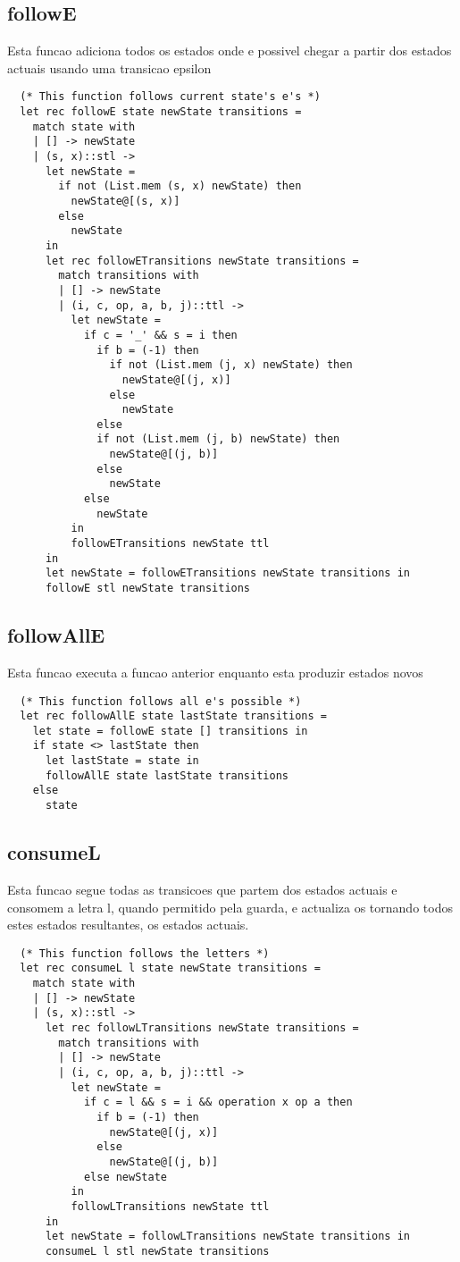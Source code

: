 \documentclass[11pt]{article}
\begin{document}
\subsection{followE}
\label{sec:orgf0d5f4e}
Esta funcao adiciona todos os estados onde e possivel chegar a partir dos estados actuais usando uma transicao epsilon
\begin{verbatim}
  (* This function follows current state's e's *)
  let rec followE state newState transitions =
    match state with
    | [] -> newState
    | (s, x)::stl ->
      let newState =
        if not (List.mem (s, x) newState) then
          newState@[(s, x)]
        else
          newState
      in
      let rec followETransitions newState transitions =
        match transitions with
        | [] -> newState
        | (i, c, op, a, b, j)::ttl ->
          let newState =
            if c = '_' && s = i then
              if b = (-1) then
                if not (List.mem (j, x) newState) then
                  newState@[(j, x)]
                else
                  newState
              else
              if not (List.mem (j, b) newState) then
                newState@[(j, b)]
              else
                newState
            else
              newState
          in
          followETransitions newState ttl
      in
      let newState = followETransitions newState transitions in
      followE stl newState transitions
\end{verbatim}
\subsection{followAllE}
\label{sec:org3d28175}
Esta funcao executa a funcao anterior enquanto esta produzir estados novos
\begin{verbatim}
  (* This function follows all e's possible *)
  let rec followAllE state lastState transitions =
    let state = followE state [] transitions in
    if state <> lastState then
      let lastState = state in
      followAllE state lastState transitions
    else
      state
\end{verbatim}
\subsection{consumeL}
\label{sec:orgf77dce2}
Esta funcao segue todas as transicoes que partem dos estados actuais e consomem a letra l, quando permitido pela guarda, e actualiza os tornando todos estes estados resultantes, os estados actuais.
\begin{verbatim}
  (* This function follows the letters *)
  let rec consumeL l state newState transitions =
    match state with
    | [] -> newState
    | (s, x)::stl ->
      let rec followLTransitions newState transitions =
        match transitions with
        | [] -> newState
        | (i, c, op, a, b, j)::ttl ->
          let newState =
            if c = l && s = i && operation x op a then
              if b = (-1) then
                newState@[(j, x)]
              else
                newState@[(j, b)]
            else newState
          in
          followLTransitions newState ttl
      in
      let newState = followLTransitions newState transitions in
      consumeL l stl newState transitions
\end{verbatim}
\end{document}
